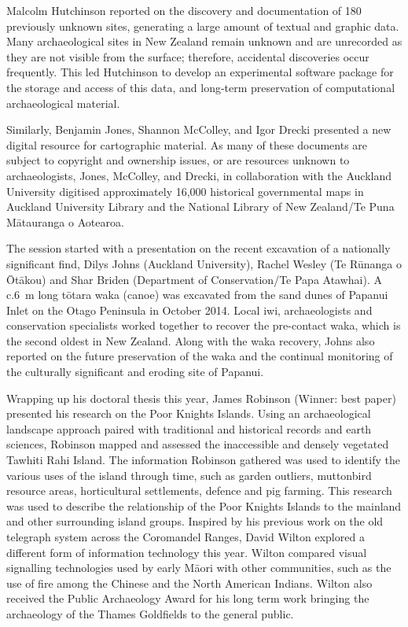 Malcolm Hutchinson reported on the discovery and documentation of 180 previously unknown sites, generating a large amount of textual and graphic data. Many archaeological sites in New Zealand remain unknown and are unrecorded as they are not visible from the surface; therefore, accidental discoveries occur frequently. This led Hutchinson to develop an experimental software package for the storage and access of this data, and long-term preservation of computational archaeological material. 

Similarly, Benjamin Jones, Shannon McColley, and Igor Drecki presented a new digital resource for cartographic material. As many of these documents are subject to copyright and ownership issues, or are resources unknown to archaeologists, Jones, McColley, and Drecki, in collaboration with the Auckland University digitised approximately 16,000 historical governmental maps in Auckland University Library and the National Library of New Zealand/Te Puna Mātauranga o Aotearoa. 


The session started with a presentation on the recent excavation of a nationally significant find, Dilys Johns (Auckland University), Rachel Wesley (Te Rūnanga o Ōtākou) and Shar Briden (Department of Conservation/Te Papa Atawhai). A c.\SI{6}{\metre} long tōtara waka (canoe) was excavated from the sand dunes of Papanui Inlet on the Otago Peninsula in October 2014. Local iwi, archaeologists and conservation specialists worked together to recover the pre-contact waka, which is the second oldest in New Zealand. Along with the waka recovery, Johns also reported on the future preservation of the waka and the continual monitoring of the culturally significant and eroding site of Papanui.    
  
Wrapping up his doctoral thesis this year, James Robinson (Winner: best paper) presented his research on the Poor Knights Islands. Using an archaeological landscape approach paired with traditional and historical records and earth sciences, Robinson mapped and assessed the inaccessible and densely vegetated Tawhiti Rahi Island. The information Robinson gathered was used to identify the various uses of the island through time, such as garden outliers, muttonbird resource areas, horticultural settlements, defence and pig farming. This research was used to describe the relationship of the Poor Knights Islands to the mainland and other surrounding island groups.
Inspired by his previous work on the old telegraph system across the Coromandel Ranges, David Wilton explored a different form of information technology this year. Wilton compared visual signalling technologies used by early Māori with other communities, such as the use of fire among the Chinese and the North American Indians. Wilton also received the Public Archaeology Award for his long term work bringing the archaeology of the Thames Goldfields to the general public.

